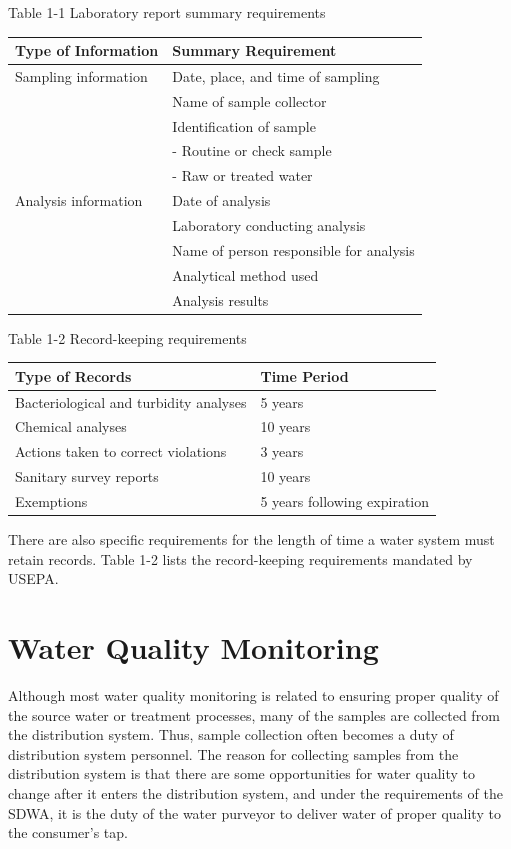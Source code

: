 \documentclass[10pt]{article}
\begin{document}
Table 1-1 Laboratory report summary requirements

\begin{tabular}{ll}
\hline
Type of Information & Summary Requirement \\
\hline
Sampling information & Date, place, and time of sampling \\
 & Name of sample collector \\
 & Identification of sample \\
 & - Routine or check sample \\
 & - Raw or treated water \\
Analysis information & Date of analysis \\
 & Laboratory conducting analysis \\
 & Name of person responsible for analysis \\
 & Analytical method used \\
 & Analysis results \\
\hline
\end{tabular}

Table 1-2 Record-keeping requirements

\begin{tabular}{ll}
\hline
Type of Records & Time Period \\
\hline
Bacteriological and turbidity analyses & 5 years \\
Chemical analyses & 10 years \\
Actions taken to correct violations & 3 years \\
Sanitary survey reports & 10 years \\
Exemptions & 5 years following expiration \\
\hline
\end{tabular}

There are also specific requirements for the length of time a water system must retain records. Table 1-2 lists the record-keeping requirements mandated by USEPA.

\section{Water Quality Monitoring}
Although most water quality monitoring is related to ensuring proper quality of the source water or treatment processes, many of the samples are collected from the distribution system. Thus, sample collection often becomes a duty of distribution system personnel. The reason for collecting samples from the distribution system is that there are some opportunities for water quality to change after it enters the distribution system, and under the requirements of the SDWA, it is the duty of the water purveyor to deliver water of proper quality to the consumer's tap.
\end{document}
